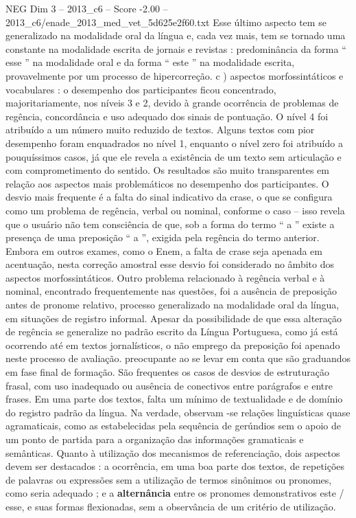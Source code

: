 \begin{textsample}{NEG Dim 3 – 2013\_c6 – Score -2.00 – 2013\_c6/enade\_2013\_med\_vet\_5d625e2f60.txt}
Esse último aspecto tem se generalizado na modalidade oral da língua e, cada vez mais, tem se tornado uma constante na modalidade escrita de jornais e revistas : predominância da forma “ esse ” na modalidade oral e da forma “ este ” na modalidade escrita, provavelmente por um processo de hipercorreção. c ) aspectos morfossintáticos e vocabulares : o desempenho dos participantes ficou concentrado, majoritariamente, nos níveis 3 e 2, devido à grande ocorrência de problemas de regência, concordância e uso adequado dos sinais de pontuação.
O nível 4 foi atribuído a um número muito reduzido de textos.
Alguns textos com pior desempenho foram enquadrados no nível 1, enquanto o nível zero foi atribuído a pouquíssimos casos, já que ele revela a existência de um texto sem articulação e com comprometimento do sentido.
Os resultados são muito transparentes em relação aos aspectos mais problemáticos no desempenho dos participantes.
O desvio mais frequente é a falta do sinal indicativo da crase, o que se configura como um problema de regência, verbal ou nominal, conforme o caso – isso revela que o usuário não tem consciência de que, sob a forma do termo “ a ” existe a presença de uma preposição “ a ”, exigida pela regência do termo anterior.
Embora em outros exames, como o Enem, a falta de crase seja apenada em acentuação, nesta correção amostral esse desvio foi considerado no âmbito dos aspectos morfossintáticos.
Outro problema relacionado à regência verbal e à nominal, encontrado frequentemente nas questões, foi a ausência de preposição antes de pronome relativo, processo generalizado na modalidade oral da língua, em situações de registro informal.
Apesar da possibilidade de que essa alteração de regência se generalize no padrão escrito da Língua Portuguesa, como já está ocorrendo até em textos jornalísticos, o não emprego da preposição foi apenado neste processo de avaliação. preocupante ao se levar em conta que são graduandos em fase final de formação.
São frequentes os casos de desvios de estruturação frasal, com uso inadequado ou ausência de conectivos entre parágrafos e entre frases.
Em uma parte dos textos, falta um mínimo de textualidade e de domínio do registro padrão da língua.
Na verdade, observam -se relações linguísticas quase agramaticais, como as estabelecidas pela sequência de gerúndios sem o apoio de um ponto de partida para a organização das informações gramaticais e semânticas.
Quanto à utilização dos mecanismos de referenciação, dois aspectos devem ser destacados : a ocorrência, em uma boa parte dos textos, de repetições de palavras ou expressões sem a utilização de termos sinônimos ou pronomes, como seria adequado ; e a \textbf{alternância} entre os pronomes demonstrativos este / esse, e suas formas flexionadas, sem a observância de um critério de utilização.

\end{textsample}
